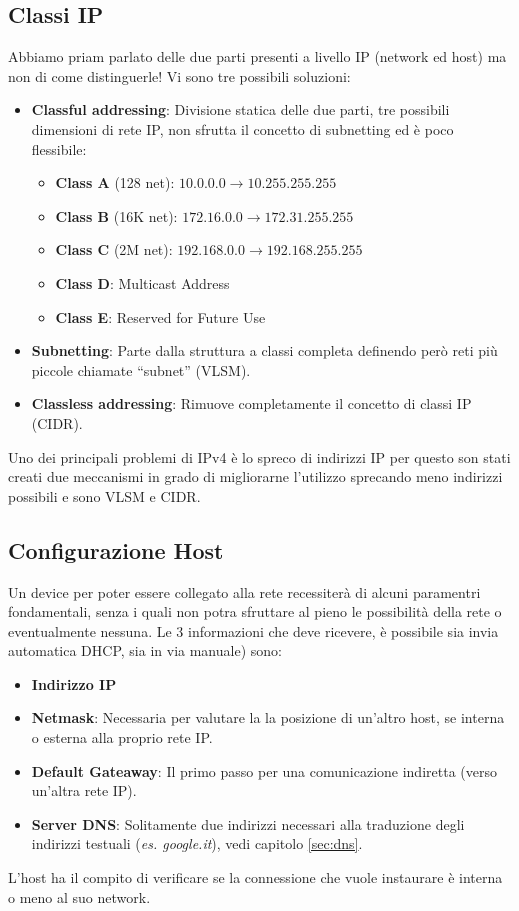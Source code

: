 \documentclass[12pt]{article}
\begin{document}
\subsection{Classi IP} %
Abbiamo priam parlato delle due parti presenti a livello IP (network ed host) ma non di come distinguerle! Vi sono tre possibili soluzioni:
\begin{itemize}
  \item \textbf{Classful addressing}: Divisione statica delle due parti, tre possibili dimensioni di rete IP, non sfrutta il concetto di subnetting ed è poco flessibile:
  \begin{itemize}
    \item \textbf{Class A} (128 net): $10.0.0.0\rightarrow10.255.255.255$
    \item \textbf{Class B} (16K net): $172.16.0.0\rightarrow172.31.255.255$
    \item \textbf{Class C} (2M net): $192.168.0.0\rightarrow192.168.255.255$
    \item \textbf{Class D}: Multicast Address
    \item \textbf{Class E}: Reserved for Future Use
  \end{itemize}
  \item \textbf{Subnetting}: Parte dalla struttura a classi completa definendo però reti più piccole chiamate ``subnet'' (VLSM).
  \item \textbf{Classless addressing}: Rimuove completamente il concetto di classi IP (CIDR).
\end{itemize}
Uno dei principali problemi di IPv4 è lo spreco di indirizzi IP per questo son stati creati due meccanismi in grado di migliorarne l'utilizzo sprecando meno indirizzi possibili e sono VLSM e CIDR.

\subsection{Configurazione Host} \label{subsec:hostconfig} %
Un device per poter essere collegato alla rete recessiterà di alcuni paramentri fondamentali, senza i quali non potra sfruttare al pieno le possibilità della rete o eventualmente nessuna. Le 3 informazioni che deve ricevere, è possibile sia invia automatica DHCP, sia in via manuale) sono:
\begin{itemize}
  \item \textbf{Indirizzo IP}
  \item \textbf{Netmask}: Necessaria per valutare la la posizione di un'altro host, se interna o esterna alla proprio rete IP.
  \item \textbf{Default Gateaway}: Il primo passo per una comunicazione indiretta (verso un'altra rete IP).
  \item \textbf{Server DNS}: Solitamente due indirizzi necessari alla traduzione degli indirizzi testuali (\textit{es. google.it}), vedi capitolo \ref{sec:dns}.
\end{itemize}
L'host ha il compito di verificare se la connessione che vuole instaurare è interna o meno al suo network.
\end{document}
